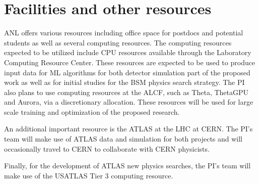 \documentclass[letter, USenglish, 11pt, subfigure]{article}
\begin{document}

\clearpage

\printbibliography
\clearpage

\section{Facilities and  other resources}
ANL offers various resources including office space for postdocs and potential students as well as several computing resources. The computing resources expected to be utilized include CPU resources available through the Laboratory Computing Resource Center. These resources are expected to be used to produce input data for ML algorithms for both detector simulation part of the proposed work as well as for initial studies for the BSM physics search strategy. The PI also plans to use computing resources at the ALCF, such as Theta, ThetaGPU and Aurora, via a discretionary allocation. These resources will be used for large scale training and optimization of the proposed research.

An additional important resource is the ATLAS at the LHC at CERN. The PI's team will make use of ATLAS data and simulation for both projects and will occasionally travel to CERN to collaborate with CERN physicists.

Finally, for the development of ATLAS new physics searches, the PI's team will make use of the USATLAS Tier 3 computing resource.
\end{document}
